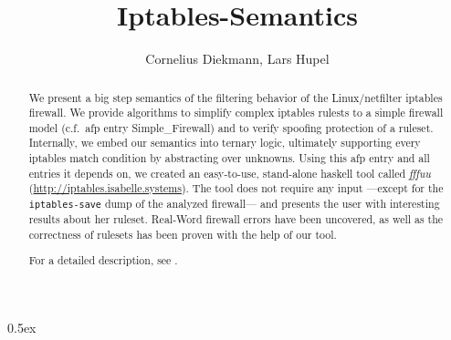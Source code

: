 \documentclass[11pt,a4paper]{article}
\begin{document}
\title{Iptables-Semantics}
\author{Cornelius Diekmann, Lars Hupel}
\maketitle

\begin{abstract}  
  We present a big step semantics of the filtering behavior of the Linux/netfilter iptables firewall. 
  We provide algorithms to simplify complex iptables rulests to a simple firewall model (c.f.\ afp entry Simple\_Firewall) and to verify spoofing protection of a ruleset. 
  Internally, we embed our semantics into ternary logic, ultimately supporting every iptables match condition by abstracting over unknowns. 
  Using this afp entry and all entries it depends on, we created an easy-to-use, stand-alone haskell tool called \emph{fffuu} (\url{http://iptables.isabelle.systems}). 
  The tool does not require any input ---except for the \texttt{iptables-save} dump of the analyzed firewall--- and presents the user with interesting results about her ruleset. 
  Real-Word firewall errors have been uncovered, as well as the correctness of rulesets has been proven with the help of our tool. 
  
For a detailed description, see \cite{diekmann2015fm,diekmann2015cnsm,diekmann2016networking,diekmann2015congress}. 
\end{abstract}

\tableofcontents

\parindent 0pt\parskip 0.5ex





\end{document}
